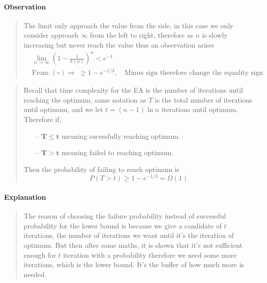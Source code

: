 \documentclass[a4paper, 12pt]{article}
\begin{document}
        \paragraph{Observation}
            \begin{quote}
                The limit only approach the value from the side, in this case we only consider approach $\infty$ from the left to right, therefore as $n$ is slowly
                increasing but never reach the value thus an observation arises
                \begin{equation*}
                    \begin{aligned}
                        &\lim_{n\rightarrow\infty}\left(1-\frac{1}{h(n)}\right)^n < e^{-1}\\
                        &\text{From } (\circ)\Rightarrow\; \geq 1 - e^{-1/3},\quad\text{Minus sign therefore change the equality sign}
                    \end{aligned}
                \end{equation*}
            \end{quote}
        \begin{quote}
            Recall that time complexity for the EA is the number of iterations until reaching the optimum, same notation as $T$ is the total number of iterations
            until optimum, and we let $t = (n-1)\ln n$ iterations until optimum. Therefore if,
            \begin{itemize}
                \item[--] $\boldsymbol{T\leq t}$ meaning sucessfully reaching optimum.
                \item[--] $\boldsymbol{T > t}$ meaning failed to reaching optimum.
            \end{itemize} 
            Then the probability of failing to reach optimum is
            \begin{equation*}
                P(T > t) \geq 1-e^{-1/3} = \Omega(1)
            \end{equation*}
        \end{quote}
        \paragraph{Explanation}
            \begin{quote}
                The reason of choosing the failure probability instead of successful probability for the lower bound is because we give a candidate of $t$
                iterations, the number of iterations we want until it's the iteration of optimum. But then after some maths, it is shown that it's not
                sufficient enough for $t$ iteration with a probability therefore we need some more iterations, which is the lower bound. It's the buffer of 
                how much more is needed.
            \end{quote}
\end{document}

